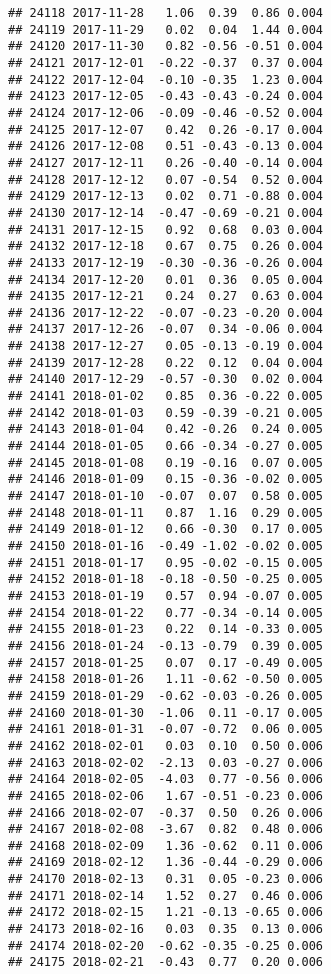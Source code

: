 \documentclass[
]{article}
\begin{document}
\begin{verbatim}
## 24118 2017-11-28   1.06  0.39  0.86 0.004
## 24119 2017-11-29   0.02  0.04  1.44 0.004
## 24120 2017-11-30   0.82 -0.56 -0.51 0.004
## 24121 2017-12-01  -0.22 -0.37  0.37 0.004
## 24122 2017-12-04  -0.10 -0.35  1.23 0.004
## 24123 2017-12-05  -0.43 -0.43 -0.24 0.004
## 24124 2017-12-06  -0.09 -0.46 -0.52 0.004
## 24125 2017-12-07   0.42  0.26 -0.17 0.004
## 24126 2017-12-08   0.51 -0.43 -0.13 0.004
## 24127 2017-12-11   0.26 -0.40 -0.14 0.004
## 24128 2017-12-12   0.07 -0.54  0.52 0.004
## 24129 2017-12-13   0.02  0.71 -0.88 0.004
## 24130 2017-12-14  -0.47 -0.69 -0.21 0.004
## 24131 2017-12-15   0.92  0.68  0.03 0.004
## 24132 2017-12-18   0.67  0.75  0.26 0.004
## 24133 2017-12-19  -0.30 -0.36 -0.26 0.004
## 24134 2017-12-20   0.01  0.36  0.05 0.004
## 24135 2017-12-21   0.24  0.27  0.63 0.004
## 24136 2017-12-22  -0.07 -0.23 -0.20 0.004
## 24137 2017-12-26  -0.07  0.34 -0.06 0.004
## 24138 2017-12-27   0.05 -0.13 -0.19 0.004
## 24139 2017-12-28   0.22  0.12  0.04 0.004
## 24140 2017-12-29  -0.57 -0.30  0.02 0.004
## 24141 2018-01-02   0.85  0.36 -0.22 0.005
## 24142 2018-01-03   0.59 -0.39 -0.21 0.005
## 24143 2018-01-04   0.42 -0.26  0.24 0.005
## 24144 2018-01-05   0.66 -0.34 -0.27 0.005
## 24145 2018-01-08   0.19 -0.16  0.07 0.005
## 24146 2018-01-09   0.15 -0.36 -0.02 0.005
## 24147 2018-01-10  -0.07  0.07  0.58 0.005
## 24148 2018-01-11   0.87  1.16  0.29 0.005
## 24149 2018-01-12   0.66 -0.30  0.17 0.005
## 24150 2018-01-16  -0.49 -1.02 -0.02 0.005
## 24151 2018-01-17   0.95 -0.02 -0.15 0.005
## 24152 2018-01-18  -0.18 -0.50 -0.25 0.005
## 24153 2018-01-19   0.57  0.94 -0.07 0.005
## 24154 2018-01-22   0.77 -0.34 -0.14 0.005
## 24155 2018-01-23   0.22  0.14 -0.33 0.005
## 24156 2018-01-24  -0.13 -0.79  0.39 0.005
## 24157 2018-01-25   0.07  0.17 -0.49 0.005
## 24158 2018-01-26   1.11 -0.62 -0.50 0.005
## 24159 2018-01-29  -0.62 -0.03 -0.26 0.005
## 24160 2018-01-30  -1.06  0.11 -0.17 0.005
## 24161 2018-01-31  -0.07 -0.72  0.06 0.005
## 24162 2018-02-01   0.03  0.10  0.50 0.006
## 24163 2018-02-02  -2.13  0.03 -0.27 0.006
## 24164 2018-02-05  -4.03  0.77 -0.56 0.006
## 24165 2018-02-06   1.67 -0.51 -0.23 0.006
## 24166 2018-02-07  -0.37  0.50  0.26 0.006
## 24167 2018-02-08  -3.67  0.82  0.48 0.006
## 24168 2018-02-09   1.36 -0.62  0.11 0.006
## 24169 2018-02-12   1.36 -0.44 -0.29 0.006
## 24170 2018-02-13   0.31  0.05 -0.23 0.006
## 24171 2018-02-14   1.52  0.27  0.46 0.006
## 24172 2018-02-15   1.21 -0.13 -0.65 0.006
## 24173 2018-02-16   0.03  0.35  0.13 0.006
## 24174 2018-02-20  -0.62 -0.35 -0.25 0.006
## 24175 2018-02-21  -0.43  0.77  0.20 0.006

\end{verbatim}
\end{document}
